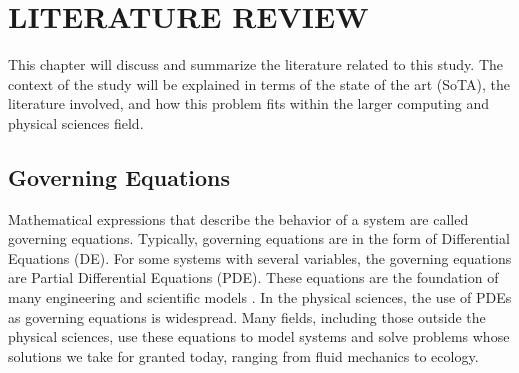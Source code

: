 \chapter{LITERATURE REVIEW}
\noindent This chapter will discuss and summarize the literature related to this study. The context of the study will be explained in terms of the state of the art (SoTA), the literature involved, and how this problem fits within the larger computing and physical sciences field.

\section{Governing Equations}
\noindent Mathematical expressions that describe the behavior of a system are called governing equations. Typically, governing equations are in the form of Differential Equations (DE). For some systems with several variables, the governing equations are Partial Differential Equations (PDE). These equations are the foundation of many engineering and scientific models \autocite{olverIntroductionPartialDifferential2014,andersonGoverningEquationsFluid1992}. In the physical sciences, the use of PDEs as governing equations is widespread. Many fields, including those outside the physical sciences, use these equations to model systems and solve problems whose solutions we take for granted today, ranging from fluid mechanics to ecology.

